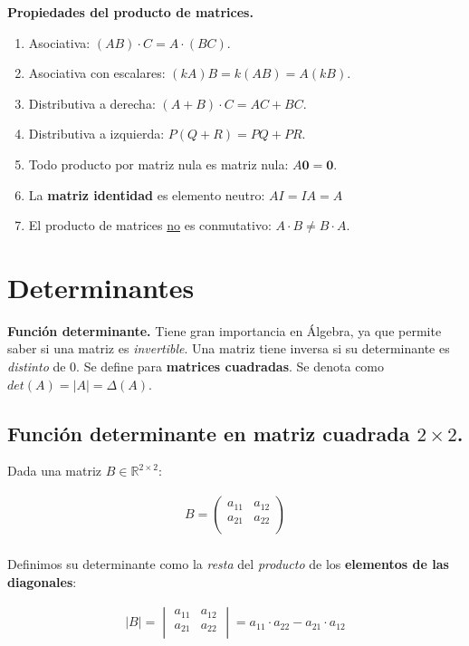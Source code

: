 \documentclass[12pt]{article}
\begin{document}
\textbf{Propiedades del producto de matrices.}

\begin{enumerate}
  \item Asociativa: \((AB) \cdot C = A \cdot (BC)\).
  \item Asociativa con escalares: \((kA)B = k(AB) = A(kB)\).
  \item Distributiva a derecha: \((A+B)\cdot C = AC + BC\).
  \item Distributiva a izquierda: \(P(Q+R) = PQ + PR\).
  \item Todo producto por matriz nula es matriz nula:
        \(A\mathbf{0} = \mathbf{0}\).
  \item La \textbf{matriz identidad} es elemento neutro:
        \(AI = IA = A\)
  \item El producto de matrices \underline{no} es conmutativo:
        \(A \cdot B \neq B \cdot A\).
\end{enumerate}

\section{Determinantes}

\textbf{Función determinante.}
Tiene gran importancia en Álgebra,
ya que permite saber si una matriz es \textit{invertible}.
Una matriz tiene inversa si su determinante es \textit{distinto} de 0.
Se define para \textbf{matrices cuadradas}.
Se denota como \(det(A) = |A| = \Delta(A)\).

\subsection{Función determinante en matriz cuadrada \(2 \times 2\).}

Dada una matriz \(B \in \mathbb{R}^{2 \times 2}\):

\begin{align*}
  B = \begin{pmatrix}
        a_{11} & a_{12} \\
        a_{21} & a_{22} \\
      \end{pmatrix} \\
\end{align*}

Definimos su determinante como la \textit{resta} del \textit{producto} de
los \textbf{elementos de las diagonales}:

\begin{align*}
  |B| = \begin{vmatrix}
          a_{11} & a_{12} \\
          a_{21} & a_{22} \\
        \end{vmatrix}
  = a_{11} \cdot a_{22} - a_{21} \cdot a_{12}
\end{align*}
\end{document}
